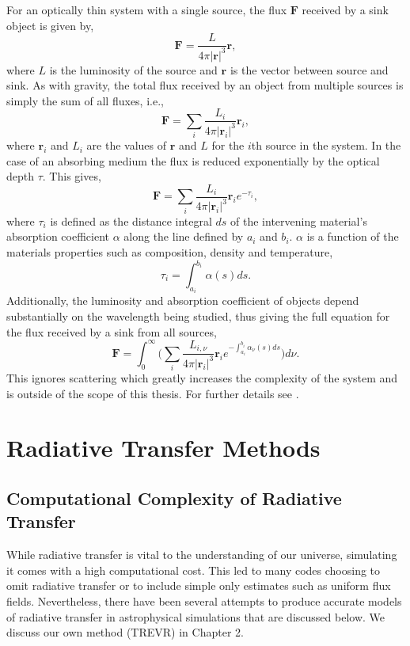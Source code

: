 For an optically thin system with a single source, the flux $\bm{F}$ received by a sink object is given by,
\begin{equation}
\label{eqn:flux}
\bm{F} = \frac{L}{4\pi |\bm{r}|^3}\bm{r},
\end{equation}
where $L$ is the luminosity of the source and $\bm{r}$ is the vector between source and sink. As with gravity, the total flux received by an object from multiple sources is simply the sum of all fluxes, i.e.,
\begin{equation}
\bm{F} = \sum_{i}{\frac{L_i}{4\pi |\bm{r}_i|^3}}\bm{r}_i,
\end{equation}
where $\bm{r}_i$ and $L_i$ are the values of $\bm{r}$ and $L$ for the $i$th source in the system. In the case of an absorbing medium the flux is reduced exponentially by the optical depth $\tau$. This gives,
\begin{equation}
\bm{F} = \sum_{i}{\frac{L_i}{4\pi |\bm{r}_i|^3}\bm{r}_i e^{-\tau_i}},
\label{eqn:fluxThick}
\end{equation}
where $\tau_i$ is defined as the distance integral $ds$ of the intervening material's absorption coefficient $\alpha$ along the line defined by $a_i$ and $b_i$. $\alpha$ is a function of the materials properties such as composition, density and temperature,
\begin{equation}
    \tau_i = \int_{a_i}^{b_i}{\alpha(s) ds}.
    \label{eqn:tau}
\end{equation}
Additionally, the luminosity and absorption coefficient of objects depend substantially on the wavelength being studied, thus giving the full equation for the flux received by a sink from all sources,
\begin{equation}
\bm{F} = \int_{0}^{\infty}{\bigg( \sum_{i}{\frac{L_{i,\nu}}{4\pi |\bm{r}_i|^3}\bm{r}_i e^{-\int_{a_i}^{b_i}{\alpha_{\nu}(s) ds}}}\bigg) d\nu}.
\end{equation}
This ignores scattering which greatly increases the complexity of the system and is outside of the scope of this thesis. For further details see \citet{R&L}.

\section{Radiative Transfer Methods}

\subsection{Computational Complexity of Radiative Transfer}
While radiative transfer is vital to the understanding of our universe, simulating it comes with a high computational cost. This led to many codes choosing to omit radiative transfer or to include simple only estimates such as uniform flux fields. Nevertheless, there have been several attempts to produce accurate models of radiative transfer in astrophysical simulations that are discussed below. We discuss our own method (TREVR) in Chapter 2.

